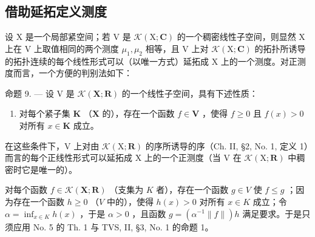 \subsection{借助延拓定义测度}

设 X 是一个局部紧空间；若 V 是 \(\mathcal{K}(\mathrm{X};\mathbf{C})\) 的一个稠密线性子空间，则显然 X 上在 V 上取值相同的两个测度 \(\mu_{1}, \mu_{2}\) 相等，且 V 上对 \(\mathcal{K}(\mathrm{X};\mathbf{C})\) 的拓扑所诱导的拓扑连续的每个线性形式可以（以唯一方式）延拓成 X 上的一个测度。对正测度而言，一个方便的判别法如下：

命题 9. --- 设 V 是 \(\mathcal{K}(\mathbf{X};\mathbf{R})\) 的一个线性子空间，具有下述性质：

\begin{enumerate}
\def\labelenumi{(\Alph{enumi})}
\setcounter{enumi}{15}
\tightlist
\item
  对每个紧子集 \(\mathbf{K}\) （\(\mathbf{X}\) 的），存在一个函数 \(f \in \mathbf{V}\) ，使得 \(f \geqslant 0\) 且 \(f(x) > 0\) 对所有 \(x \in \mathbf{K}\) 成立。
\end{enumerate}

在这些条件下，V 上对由 \(\mathcal{K}(\mathrm{X};\mathbf{R})\) 的序所诱导的序（Ch. II, §2, No. 1, 定义 1）而言的每个正线性形式可以延拓成 X 上的一个正测度（当 V 在 \(\mathcal{K}(\mathrm{X};\mathbf{R})\) 中稠密时它是唯一的）。

对每个函数 \(f \in \mathcal{K}(\mathbf{X};\mathbf{R})\) （支集为 \(K\) 者），存在一个函数 \(g \in V\) 使 \(f \leqslant g\) ；因为存在一个函数 \(h \geqslant 0\) （\(V\) 中的），使得 \(h(x) > 0\) 对所有 \(x \in K\) 成立；令 \(\alpha = \inf_{x \in K} h(x)\) ，于是 \(\alpha > 0\) ，且函数 \(g = (\alpha^{-1} \|f\|)h\) 满足要求。于是只须应用 No. 5 的 Th. 1 与 TVS, II, §3, No. 1 的命题 1。

